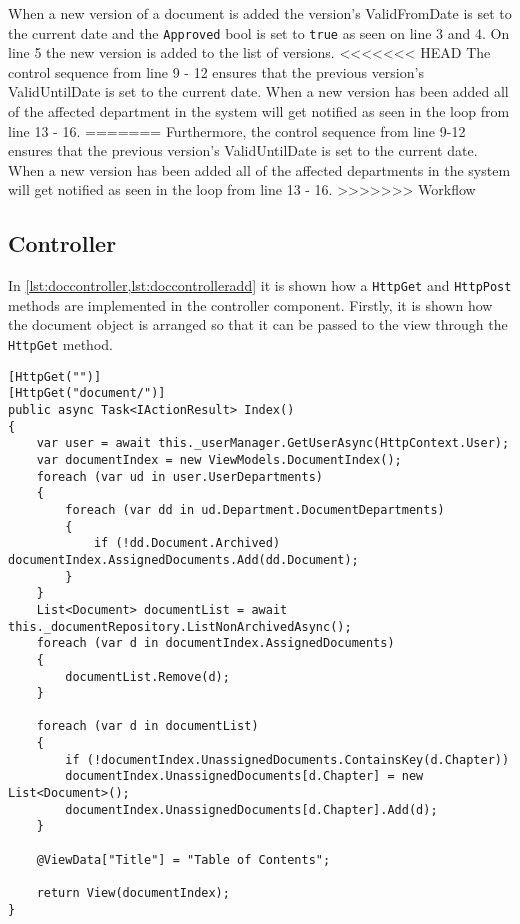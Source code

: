 When a new version of a document is added the version's ValidFromDate is set to the current date and the \texttt{Approved} bool is set to \texttt{true} as seen on line 3 and 4.
On line 5 the new version is added to the list of versions.
<<<<<<< HEAD
The control sequence from line 9 - 12 ensures that the previous version's ValidUntilDate is set to the current date.
When a new version has been added all of the affected department in the system will get notified as seen in the loop from line 13 - 16.
=======
Furthermore, the control sequence from line 9-12 ensures that the previous version's ValidUntilDate is set to the current date.
When a new version has been added all of the affected departments in the system will get notified as seen in the loop from line 13 - 16.
>>>>>>> Workflow

\subsection{Controller}

In \cref{lst:doccontroller,lst:doccontrolleradd} it is shown how a \texttt{HttpGet} and \texttt{HttpPost} methods are implemented in the controller component.
Firstly, it is shown how the document object is arranged so that it can be passed to the view through the \texttt{HttpGet} method.

\begin{lstlisting}[caption={Document Controller: Index}, label={lst:doccontroller}]
[HttpGet("")]
[HttpGet("document/")]
public async Task<IActionResult> Index()
{
	var user = await this._userManager.GetUserAsync(HttpContext.User);
	var documentIndex = new ViewModels.DocumentIndex();
	foreach (var ud in user.UserDepartments)
	{
		foreach (var dd in ud.Department.DocumentDepartments)
		{
			if (!dd.Document.Archived) documentIndex.AssignedDocuments.Add(dd.Document);
		}
	}
	List<Document> documentList = await this._documentRepository.ListNonArchivedAsync();
	foreach (var d in documentIndex.AssignedDocuments)
	{
		documentList.Remove(d);
	}

	foreach (var d in documentList)
	{
		if (!documentIndex.UnassignedDocuments.ContainsKey(d.Chapter))
		documentIndex.UnassignedDocuments[d.Chapter] = new List<Document>();
		documentIndex.UnassignedDocuments[d.Chapter].Add(d);
	}

	@ViewData["Title"] = "Table of Contents";

	return View(documentIndex);
}
\end{lstlisting}

